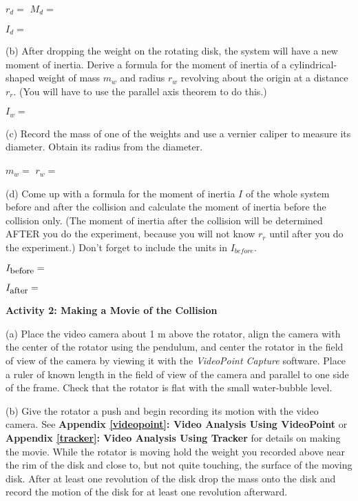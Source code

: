\( r_{d} =\)  \hfill{}\( M_{d}= \) \hfill{}
\vspace{5mm}

\( I_{d}= \)
\vspace{5mm}

(b) After dropping the weight on the rotating disk, the system will have a new
moment of inertia. Derive a formula for the moment of inertia of a cylindrical-shaped weight of mass \( m_{w} \) and radius \( r_{w} \) revolving about the origin at a distance \( r_{r} \). (You will have to use the parallel axis theorem to do this.)
\vspace{5mm}

\( I_{w} =\)  
\vspace{10mm}

(c) Record the mass of one of the weights and use a vernier caliper to measure its diameter. Obtain its radius from the diameter.
\vspace{5mm}

\( m_{w} =\)  \hfill{}\(r_{w} =\) \hfill{}
\vspace{5mm}

(d) Come up with a formula for the moment of inertia $I$ of the whole system
before and after the collision and calculate the moment of inertia before the
collision only. (The moment of inertia after the collision will be determined AFTER you do the experiment, because you will not know \( r_{r} \) until after you do the experiment.) Don't forget to include the units in \( I_{before} \).
\vspace{5mm}

\( I_{\mbox{\small before}}= \) 
\vspace{5mm}

\( I_{\mbox{\small after}} =\)  
\vspace{5mm}

\textbf{Activity 2: Making a Movie of the Collision} 

(a) Place the video camera about 1 m above the rotator, align the camera with
the center of the rotator using the pendulum, and center the rotator in the
field of view of the camera by viewing it with the \textit{VideoPoint
Capture} software.
Place a ruler of known length in the field of view of the camera and parallel
to one side of the frame. Check that the rotator is flat with the small water-bubble level.

(b) Give the rotator a push and begin recording its motion with the video camera. See \textbf{Appendix \ref{videopoint}: Video Analysis Using VideoPoint} or \textbf{Appendix \ref{tracker}: Video Analysis Using Tracker} for details on making the movie. While the rotator is moving hold the weight you recorded above near the rim of the disk and close to, but not quite
touching, the surface of the moving disk. After at least one revolution
of the disk drop the mass onto the disk and record the motion of
the disk for at least one revolution afterward. 

